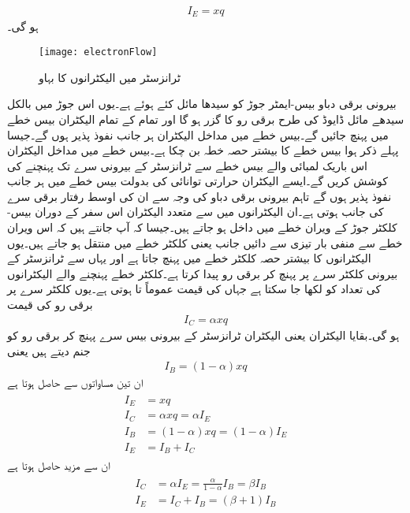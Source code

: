\begin{align}
I_E = x q
\end{align}
ہو گی۔
\begin{figure}
\centering
\texttt{[image: electronFlow]}
\caption{ ٹرانزسٹر میں الیکٹرانوں کا بہاو}
\label{شکل_ٹرانزسٹر_میں_الیکٹرانوں_کا_بہاو}
\end{figure}
	بیرونی برقی دباو بیس-ایمٹر  جوڑ کو سیدھا مائل کئے ہوئے ہے۔یوں اس جوڑ میں بالکل سیدھے مائل ڈایوڈ کی طرح برقی رو کا گزر ہو گا اور تمام کے تمام  الیکٹران بیس خطے میں پہنچ جائیں گے۔بیس خطے میں مداخل الیکٹران ہر جانب نفوذ پذیر ہوں گے۔جیسا پہلے ذکر ہوا بیس خطے کا بیشتر حصہ  خطہ بن چکا ہے۔بیس خطے میں مداخل الیکٹران اس باریک لمبائی والے بیس خطے سے ٹرانزسٹر کے بیرونی سرے   تک پہنچنے کی کوشش کریں گے۔ایسے الیکٹران حرارتی توانائی کی بدولت بیس خطے میں ہر جانب نفوذ پذیر ہوں گے تاہم بیرونی برقی دباو   کی وجہ سے ان کی اوسط رفتار برقی سرے   کی جانب ہوتی ہے۔ان الیکٹرانوں میں سے متعدد الیکٹران اس سفر کے دوران بیس-کلکٹر جوڑ کے ویران خطے میں داخل ہو جاتے ہیں۔جیسا کہ آپ جانتے ہیں کہ اس ویران  خطے سے منفی بار تیزی سے دائیں جانب یعنی کلکٹر  خطے میں منتقل ہو جاتے ہیں۔یوں   الیکٹرانوں کا بیشتر حصہ کلکٹر  خطے میں پہنچ جاتا ہے اور یہاں سے ٹرانزسٹر کے بیرونی کلکٹر  سرے پر پہنچ کر برقی رو  پیدا کرتا ہے۔کلکٹر  خطے پہنچنے والے الیکٹرانوں کی تعداد کو  لکھا جا سکتا ہے جہاں  کی قیمت عموماً  تا  ہوتی ہے۔یوں کلکٹر  سرے پر برقی رو  کی قیمت
\begin{align}
I_C = \alpha x q
\end{align}
ہو گی۔بقایا الیکٹران یعنی الیکٹران ٹرانزسٹر کے بیرونی بیس سرے پہنچ کر برقی رو  کو جنم دیتے ہیں یعنی
\begin{align}
I_B = (1-\alpha) x q 
\end{align}
ان تین مساواتوں سے حاصل ہوتا ہے
\begin{gather}
\begin{aligned}
I_E &=x q\\
I_C &=\alpha x q =\alpha I_E\\
I_B& = (1-\alpha) x q =(1-\alpha) I_E \\
I_E & = I_B + I_C
\end{aligned}
\end{gather}
ان سے مزید حاصل ہوتا ہے
\begin{gather} \label{مساوات_ٹرانزسٹر_کلکٹر _اور_مخارج_رو}
\begin{aligned}
I_C &= \alpha I_E = \frac{\alpha}{1-\alpha} I_B = \beta I_B\\
I_E &= I_C+I_B = (\beta+1) I_B
\end{aligned}
\end{gather}
